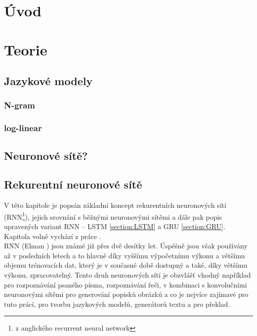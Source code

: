 \chapter{Úvod}

\chapter{Teorie}


\section{Jazykové modely}


\subsection{N-gram}
\subsection{log-linear}

\section{Neuronové sítě?}

\section{Rekurentní neuronové sítě}
V této kapitole je popsán základní koncept rekurentních neuronových sítí (RNN\footnote{z anglického recurrent neural network}), jejich srovnání s běžnými neuronovými sítěmi a dále pak popis upravených variant RNN -- LSTM \ref{section:LSTM} a GRU \ref{section:GRU}. Kapitola volně vychází z práce \cite{nmtThesis}.\\


RNN (Elman \cite{rnn}) jsou známé již přes dvě desítky let. Úspěšně jsou však používány až v posledních letech a to hlavně díky vyššímu výpočetnímu výkonu a většímu objemu trénovacích dat, který je v současné době dostupný a také, díky většímu výkonu, zpracovatelný. Tento druh neuronových sítí je obzvlášť vhodný například pro rozpoznávání psaného písma, rozpoznávání řeči, v kombinaci s konvolučními neuronovými sítěmi pro generování popisků obrázků a co je nejvíce zajímavé pro tuto práci, pro tvorbu jazykových modelů, generátorů textu a pro překlad.

